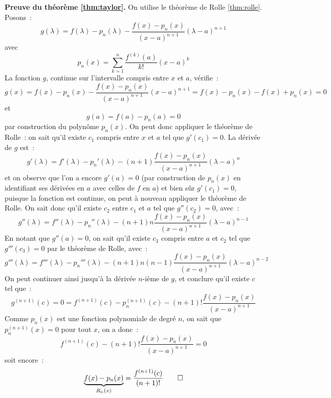 \documentclass[10pt,notheorems]{beamer}
\theoremstyle{plain}
\theoremstyle{definition} %
\begin{document}
\begin{notes}
  \textbf{Preuve du théorème \hyperlink{slide_taylor_9}{\ref{thm:taylor}}.} On utilise le théorème de Rolle \hyperlink{slide_extrema_2}{\ref{thm:rolle}}. Posons~:
  \[
    g(\lambda) = f(\lambda) - p_n(\lambda) - \frac{f(x)-p_n(x)}{(x-a)^{n+1}}(\lambda-a)^{n+1}
  \]
  avec
  \[
    p_n(x) = \sum_{k=1}^n\frac{f^{(k)}(a)}{k!}(x-a)^k
  \]
  La fonction $g$, continue sur l'intervalle compris entre $x$ et $a$, vérifie~:
  \[
    g(x) = f(x) - p_n(x) - \frac{f(x)-p_n(x)}{(x-a)^{n+1}}(x-a)^{n+1} = f(x) - p_n(x) - f(x) + p_n(x) = 0
  \]
  et
  \[
    g(a) = f(a) - p_n(a) = 0
  \]
  par construction du polynôme $p_n(x)$. On peut donc appliquer le théorème de Rolle~: on sait qu'il existe $c_1$ compris entre $x$ et $a$ tel que $g'(c_1)=0$. La dérivée de $g$ est~:
  \[
    g'(\lambda) = f'(\lambda) - p_n'(\lambda) - (n+1)\frac{f(x)-p_n(x)}{(x-a)^{n+1}}(\lambda-a)^{n}
  \]
  et on observe que l'on a encore $g'(a)=0$ (par construction de $p_n(x)$ en identifiant ses dérivées en $a$ avec celles de $f$ en $a$) et bien sûr $g'(c_1)=0$, puisque la fonction est continue, on peut à nouveau appliquer le théorème de Rolle. On sait donc qu'il existe $c_2$ entre $c_1$ et $a$ tel que $g''(c_2) = 0$, avec~:
  \[
    g''(\lambda) = f''(\lambda) - p_n''(\lambda) - (n+1)n\frac{f(x)-p_n(x)}{(x-a)^{n+1}}(\lambda-a)^{n-1}
  \]
  En notant que $g''(a)=0$, on sait qu'il existe $c_3$ compris entre $a$ et $c_2$ tel que $g'''(c_3) = 0$ par le théorème de Rolle, avec~:
  \[
    g'''(\lambda) = f'''(\lambda) - p_n'''(\lambda) - (n+1)n(n-1)\frac{f(x)-p_n(x)}{(x-a)^{n+1}}(\lambda-a)^{n-2}
  \]
  On peut continuer ainsi jusqu'à la dérivée $n$-ième de $g$, et conclure qu'il existe $c$ tel que~:
  \[
    g^{(n+1)}(c) = 0 = f^{(n+1)}(c) - p_n^{(n+1)}(c) - (n+1)!\frac{f(x)-p_n(x)}{(x-a)^{n+1}}
  \]
  Comme $p_n(x)$ est une fonction polynomiale de degré $n$, on sait que $p_n^{(n+1)}(x) = 0$ pour tout $x$, on a donc~:
  \[
    f^{(n+1)}(c) - (n+1)!\frac{f(x)-p_n(x)}{(x-a)^{n+1}} = 0
  \]
  soit encore~:
  \[
    \underbrace{f(x)-p_n(x)}_{R_n(x)} = \frac{f^{(n+1)}(c)}{(n+1)!}\qed
  \]
\end{notes}
\end{document}
